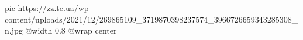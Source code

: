  
 
 
 
 

\ifcmt
  pic https://zz.te.ua/wp-content/uploads/2021/12/269865109_3719870398237574_3966726659343285308_n.jpg
  @width 0.8
  @wrap center
\fi
